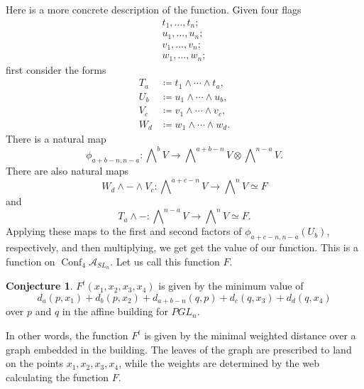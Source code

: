 \documentclass[10pt]{amsart}
\theoremstyle{definition}
\newtheorem{conj}[theorem]{Conjecture}
\newcommand{\A}{\mathcal{A}}
\newcommand{\Conf}{\operatorname{Conf}}
\begin{document}
Here is a more concrete description of the function. Given four flags 
\begin{gather*}
t_1, \dots, t_n;
\\
u_1, \dots, u_n;
\\
v_1, \dots, v_n;
\\
w_1, \dots, w_n;
\end{gather*}
first consider the forms
\begin{align*}
T_a &\coloneqq  t_1 \wedge \cdots \wedge t_a,
\\
U_b &\coloneqq  u_1 \wedge \cdots \wedge u_b,
\\
V_c &\coloneqq  v_1 \wedge \cdots \wedge v_c,
\\
W_d &\coloneqq  w_1 \wedge \cdots \wedge w_d.
\end{align*}
There is a natural map 
\[
\phi_{a+b-n, n-a}: \bigwedge\nolimits^{b} V \rightarrow \bigwedge\nolimits^{a+b-n} V \otimes \bigwedge\nolimits^{n-a} V.
\]
There are also natural maps 
\[
W_d \wedge - \wedge V_c : \bigwedge\nolimits^{a+c-n} V \rightarrow \bigwedge\nolimits^{n} V \simeq F
\] 
and 
\[
T_a \wedge - : \bigwedge\nolimits^{n-a} V \rightarrow \bigwedge\nolimits^{n} V \simeq F.
\]
Applying these maps to the first and second factors of $\phi_{a+c-n,n-a}(U_b)$, respectively, and then multiplying, we get get the value of our function. This is a function on $\Conf_4 \A_{SL_{n}}$. Let us call this function $F$.

\begin{conj} $F^t(x_1,x_2,x_3,x_4)$ is given by the minimum value of
\[
d_a(p,x_1) + d_b(p,x_2) + d_{a+b-n}(q,p) + d_c(q,x_3) + d_d(q,x_4)
\]
over $p$ and $q$ in the affine building for $PGL_n$.
\end{conj}

In other words, the function $F^t$ is given by the minimal weighted distance over a graph embedded in the building. The leaves of the graph are prescribed to land on the points $x_1, x_2, x_3, x_4$, while the weights are determined by the web calculating the function $F$.
\end{document}
